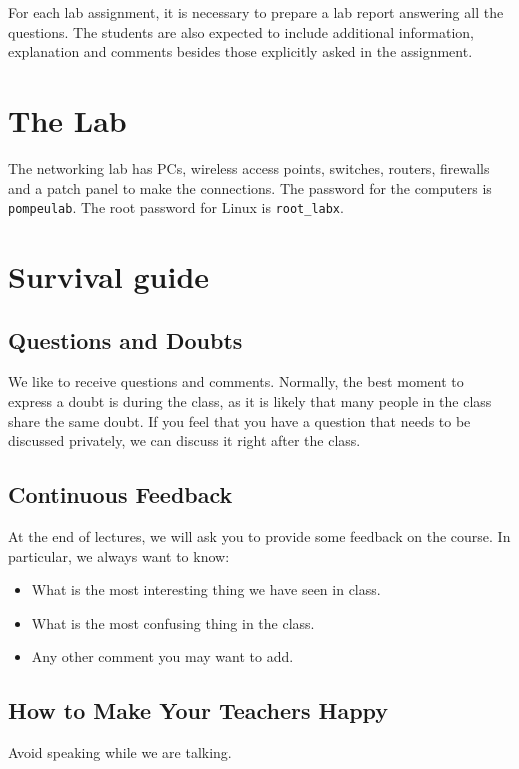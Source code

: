 For each lab assignment, it is necessary to prepare a lab report answering all the questions. The students are also expected to include additional information, explanation and comments besides those explicitly asked in the assignment.

\section{The Lab}
The networking lab has PCs, wireless access points, switches, routers, firewalls and a patch panel to make the connections.
The password for the computers is \texttt{\color{blue}pompeulab}.
The root password for Linux is \texttt{\color{blue}root\_labx}.

\section{Survival guide}

\subsection{Questions and Doubts}

We like to receive questions and comments. Normally, the best moment to express a doubt is during the class, as it is likely that many people in the class share the same doubt. If you feel that you have a question that needs to be discussed privately, we can discuss it right after the class.

\subsection{Continuous Feedback}

At the end of lectures, we will ask you to provide some feedback on the course. In particular, we always want to know:
\begin{itemize}
\item What is the most interesting thing we have seen in class.
\item What is the most confusing thing in the class.
\item Any other comment you may want to add.

\end{itemize}

\subsection{How to Make Your Teachers Happy}

Avoid speaking while we are talking.
